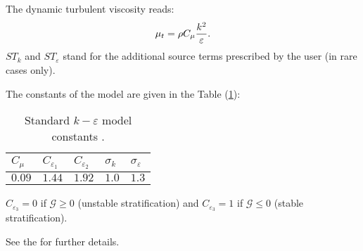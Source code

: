 The dynamic turbulent viscosity reads:
\begin{equation}
\displaystyle \mu_t=\rho C_\mu\frac{k^2}{%
\varepsilon}.
\end{equation}
$ST_{k}$ and $ST_{\varepsilon}$ stand for the additional
source terms prescribed by the user (in rare cases only).

The constants of the model are given in the Table (\ref{tab:k_epsilon_constants}):
\begin{table}[!htp]
\centering
\begin{tabular}{p{}|p{}|p{}|p{}|p{}}
$C_\mu$ & $C_{\varepsilon_1}$ & $C_{\varepsilon_2}$ & $\sigma_k$ & $%
\sigma_\varepsilon$ \\ \hline
$0.09$ & $1.44$ & $1.92$ & $1.0$ & $1.3$
\end{tabular}%
\caption{Standard $k-\varepsilon$ model constants \cite{Launder:1974}.\label{tab:k_epsilon_constants}}
\end{table}

$C_{\varepsilon_3}=0$ if $\mathcal{G}\geqslant0$ (unstable stratification)
and $C_{\varepsilon_3}=1$ if $\mathcal{G}\leqslant0$ (stable stratification).

See the  for further details.



